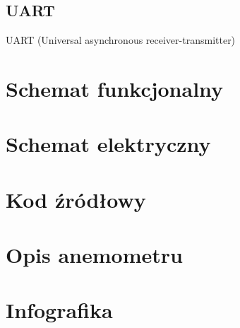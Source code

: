 \documentclass[12pt,a4paper,oneside]{memoir}
\begin{document}
\section{UART}
\par UART (Universal asynchronous receiver-transmitter) \cite{uartwiki}
\newpage
\chapter{Schemat funkcjonalny}

\newpage
\chapter{Schemat elektryczny}

\newpage
\chapter{Kod źródłowy} 

\newpage
\chapter{Opis anemometru} 

\newpage
\chapter{Infografika} 
\end{document}
